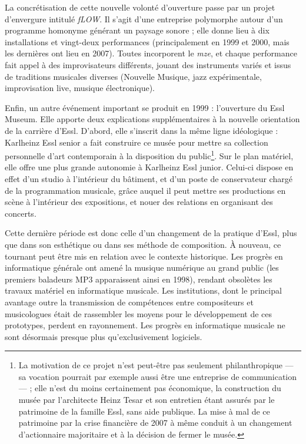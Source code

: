 \documentclass[a4paper,12pt]{article}
\newcommand{\maze}[0]{\emph{m\symbol{64}ze\textdegree2}}
\begin{document}
La concrétisation de cette nouvelle volonté d'ouverture passe par un projet d'envergure intitulé \emph{fLOW}. Il s'agit d'une entreprise polymorphe autour d'un programme homonyme générant un paysage sonore ; elle donne lieu à dix installations et vingt-deux performances (principalement en 1999 et 2000, mais les dernières ont lieu en 2007). Toutes incorporent le \maze, et chaque performance fait appel à des improvisateurs différents, jouant des instruments variés et issus de traditions musicales diverses (Nouvelle Musique, jazz expérimentale, improvisation live, musique électronique).

Enfin, un autre événement important se produit en 1999 : l'ouverture du Essl Museum. Elle apporte deux explications supplémentaires à la nouvelle orientation de la carrière d'Essl. D'abord, elle s'inscrit dans la même ligne idéologique : Karlheinz Essl senior a fait construire ce musée pour mettre sa collection personnelle d'art contemporain à la disposition du public\footnote{La motivation de ce projet n'est peut-être pas seulement philanthropique --- sa vocation pourrait par exemple aussi être une entreprise de communication --- ; elle n'est du moins certainement pas économique, la construction du musée par l'architecte Heinz Tesar et son entretien étant assurés par le patrimoine de la famille Essl, sans aide publique. La mise à mal de ce patrimoine par la crise financière de 2007 à même conduit à un changement d'actionnaire majoritaire et à la décision de fermer le musée.}. Sur le plan matériel, elle offre une plus grande autonomie à Karlheinz Essl junior. Celui-ci dispose en effet d'un studio à l'intérieur du bâtiment, et d'un poste de conservateur chargé de la programmation musicale, grâce auquel il peut mettre ses productions en scène à l'intérieur des expositions, et nouer des relations en organisant des concerts.

Cette dernière période est donc celle d'un changement de la pratique d'Essl, plus que dans son esthétique ou dans ses méthode de composition. À nouveau, ce tournant peut être mis en relation avec le contexte historique. Les progrès en informatique générale ont amené la musique numérique au grand public (les premiers baladeurs MP3 apparaissent ainsi en 1998), rendant obsolètes les travaux matériel en informatique musicale. Les institutions, dont le principal avantage outre la transmission de compétences entre compositeurs et musicologues était de rassembler les moyens pour le développement de ces prototypes, perdent en rayonnement. Les progrès en informatique musicale ne sont désormais presque plus qu'exclusivement logiciels.
\end{document}
